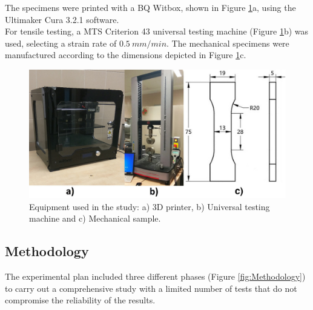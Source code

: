 \documentclass[
  12pt]{article}
\begin{document}
The specimens were printed with a BQ Witbox, shown in Figure \ref{fig:machine}a, using the Ultimaker Cura 3.2.1 software.\\
For tensile testing, a MTS Criterion 43 universal testing machine (Figure \ref{fig:machine}b) was used, selecting a strain rate of \(0.5~mm/min.\)
The mechanical specimens were manufactured according to the dimensions depicted in Figure \ref{fig:machine}c.

\begin{figure}

{\centering \includegraphics[width=0.9\linewidth]{Figures/Machine-probeta} 

}

\caption{Equipment used in the study: a) 3D printer, b) Universal testing machine and c) Mechanical sample.}\label{fig:machine}
\end{figure}

\hypertarget{methodology}{%
\subsection{Methodology}\label{methodology}}

The experimental plan included three different phases (Figure \ref{fig:Methodology}) to carry out a comprehensive study with a limited number of tests that do not compromise the reliability of the results.
\end{document}
